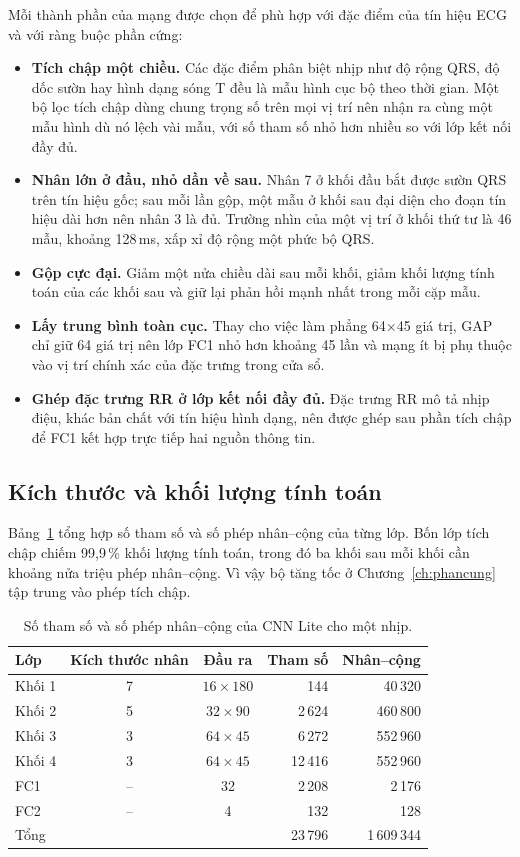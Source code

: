 Mỗi thành phần của mạng được chọn để phù hợp với đặc điểm của tín hiệu ECG và với ràng buộc phần cứng:
\begin{itemize}
  \item \textbf{Tích chập một chiều.} Các đặc điểm phân biệt nhịp như độ rộng QRS, độ dốc sườn hay hình dạng sóng T đều là mẫu hình cục bộ theo thời gian.
  Một bộ lọc tích chập dùng chung trọng số trên mọi vị trí nên nhận ra cùng một mẫu hình dù nó lệch vài mẫu, với số tham số nhỏ hơn nhiều so với lớp kết nối đầy đủ.
  \item \textbf{Nhân lớn ở đầu, nhỏ dần về sau.} Nhân 7 ở khối đầu bắt được sườn QRS trên tín hiệu gốc; sau mỗi lần gộp, một mẫu ở khối sau đại diện cho đoạn tín hiệu dài hơn nên nhân 3 là đủ.
  Trường nhìn của một vị trí ở khối thứ tư là 46 mẫu, khoảng 128\,ms, xấp xỉ độ rộng một phức bộ QRS.
  \item \textbf{Gộp cực đại.} Giảm một nửa chiều dài sau mỗi khối, giảm khối lượng tính toán của các khối sau và giữ lại phản hồi mạnh nhất trong mỗi cặp mẫu.
  \item \textbf{Lấy trung bình toàn cục.} Thay cho việc làm phẳng 64$\times$45 giá trị, GAP chỉ giữ 64 giá trị nên lớp FC1 nhỏ hơn khoảng 45 lần và mạng ít bị phụ thuộc vào vị trí chính xác của đặc trưng trong cửa sổ.
  \item \textbf{Ghép đặc trưng RR ở lớp kết nối đầy đủ.} Đặc trưng RR mô tả nhịp điệu, khác bản chất với tín hiệu hình dạng, nên được ghép sau phần tích chập để FC1 kết hợp trực tiếp hai nguồn thông tin.
\end{itemize}

\subsection{Kích thước và khối lượng tính toán}

Bảng~\ref{tab:cnnlite} tổng hợp số tham số và số phép nhân--cộng của từng lớp.
Bốn lớp tích chập chiếm 99{,}9\,\% khối lượng tính toán, trong đó ba khối sau mỗi khối cần khoảng nửa triệu phép nhân--cộng.
Vì vậy bộ tăng tốc ở Chương~\ref{ch:phancung} tập trung vào phép tích chập.

\begin{table}[htbp]
  \centering
  \caption{Số tham số và số phép nhân--cộng của CNN Lite cho một nhịp.}\label{tab:cnnlite}
  \begin{tabular}{lccrr}
    \toprule
    Lớp & Kích thước nhân & Đầu ra & Tham số & Nhân--cộng \\
    \midrule
    Khối 1 & 7 & $16\times180$ & 144 & 40\,320 \\
    Khối 2 & 5 & $32\times90$  & 2\,624 & 460\,800 \\
    Khối 3 & 3 & $64\times45$  & 6\,272 & 552\,960 \\
    Khối 4 & 3 & $64\times45$  & 12\,416 & 552\,960 \\
    FC1    & -- & 32 & 2\,208 & 2\,176 \\
    FC2    & -- & 4  & 132 & 128 \\
    \midrule
    Tổng   &    &    & 23\,796 & 1\,609\,344 \\
    \bottomrule
  \end{tabular}
\end{table}


